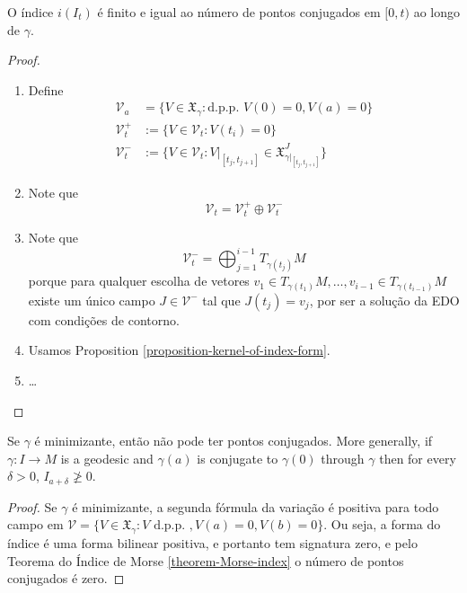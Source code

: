 \begin{theorem}
\label{theorem-morse-index}
O índice $i(I_t)$ é finito e igual ao número
de pontos conjugados em $[0,t)$ ao
longo de $\gamma$.
\end{theorem}

\begin{proof}
\begin{enumerate}
\item Define
$$
\begin{aligned}
\mathcal{V}_a&=\{V \in
\mathfrak{X}_\gamma:\text{d.p.p. }V(0)=0,
V(a)=0\}\\
\mathcal{V}_t^+&:=\{V \in
\mathcal{V}_t:V(t_i)=0\}\\
\mathcal{V}_t^-& :=\{V \in
\mathcal{V}_t:V|_{[t_j,t_{j+1}]}\in
\mathfrak{X}_{\gamma|_{[t_j,t_{j+1}]}}^J\}
\end{aligned}
$$
\item Note que
$$
\mathcal{V}_t=\mathcal{V}_t^+ \oplus
\mathcal{V}_t^-
$$
\item Note que
$$
\mathcal{V}_t^-=\bigoplus_{j=1}^{i-1}
T_{\gamma(t_j)}M
$$
porque para qualquer escolha de vetores
 $v_1 \in T_{\gamma(t_1)}M,\ldots,v_{i-1}\in
 T_{\gamma(t_{i-1})}M$ existe
 um único campo $J \in \mathcal{V}^-$ tal que
 $J(t_j)=v_j$, por ser a solução
 da EDO com condições de contorno.
\item Usamos Proposition
\ref{proposition-kernel-of-index-form}.
\item …
\end{enumerate}
\end{proof}



\begin{theorem}
\label{theorem-Jacobi-theorem}
Se $\gamma$ é minimizante, então não pode ter
pontos conjugados. More generally,
if $\gamma:I \to M$ is a geodesic and $
\gamma(a)$ is conjugate to $\gamma(0)$
through $\gamma$ then for every $\delta>0$,
$I_{a+\delta}\not \geq 0$.
\end{theorem}

\begin{proof}
Se $\gamma$ é minimizante, a segunda fórmula
da variação é positiva para todo
campo em $\mathcal{V}=\{V\in
\mathfrak{X}_\gamma:V \text{ d.p.p. },
V(a)=0,V(b)=0\}$. Ou seja, a forma do índice
é uma forma bilinear positiva, e
portanto tem signatura zero, e pelo Teorema
do Índice de Morse
\ref{theorem-Morse-index} o número de pontos
conjugados é zero.
\end{proof}

